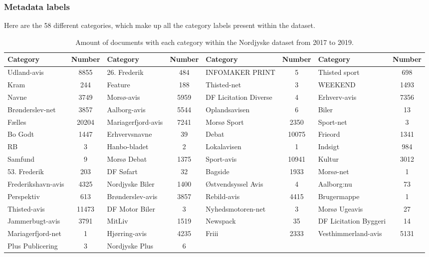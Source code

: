 \subsubsection{Metadata labels}\label{sec:appendix_meta_data}
Here are the 58 different categories, which make up all the category labels present within the dataset.

\begin{table*}[h]
	\centering
	\begin{tabular}{l|c|l|c|l|c|l|c}
		Category & Number & Category & Number & Category & Number & Category & Number \\
 		\toprule
		Udland-avis & 8855 & 26. Frederik & 484 & INFOMAKER PRINT & 5 & Thisted sport & 698\\
		Kram & 244 & Feature & 188 & Thisted-net & 3 & WEEKEND & 1493\\
		Navne & 3749 & Morsø-avis & 5959 & DF Licitation Diverse & 4 & Erhverv-avis & 7356\\
		Brønderslev-net & 3857 & Aalborg-avis & 5544 & Oplandsavisen & 6 & Biler & 13\\
		Fælles & 20204 & Mariagerfjord-avis & 7241 & Morsø Sport & 2350 & Sport-net & 3\\
		Bo Godt & 1447 & Erhvervsnavne & 39 & Debat & 10075 & Frieord & 1341\\
		RB & 3 & Hanbo-bladet & 2 & Lokalavisen & 1 & Indsigt & 984\\
		Samfund & 9 & Morsø Debat & 1375 & Sport-avis & 10941 & Kultur & 3012 \\
		53. Frederik & 203 & DF Søfart & 32 & Bagside & 1933 & Morsø-net & 1 \\
		Frederikshavn-avis & 4325 & Nordjyske Biler & 1400 & Østvendsyssel Avis & 4 & Aalborg:nu & 73\\
		Perspektiv & 613 & Brønderslev-avis & 3857 & Rebild-avis & 4415 & Brugermappe & 1\\
		Thisted-avis & 11473 & DF Motor Biler & 3 & Nyhedsmotoren-net & 3 & Morsø Ugeavis & 27\\
		Jammerbugt-avis & 3791 & MitLiv & 1519 & Newspack & 35 & DF Licitation Byggeri & 14\\
		Mariagerfjord-net & 1 & Hjørring-avis & 4235 & Friii & 2333 & Vesthimmerland-avis & 5131\\
		Plus Publicering & 3 & Nordjyske Plus & 6 & & & & \\
		\bottomrule
	\end{tabular}
	\caption{Amount of documents with each category within the Nordjyske dataset from 2017 to 2019.}
	\label{tab:category_table}
\end{table*}
